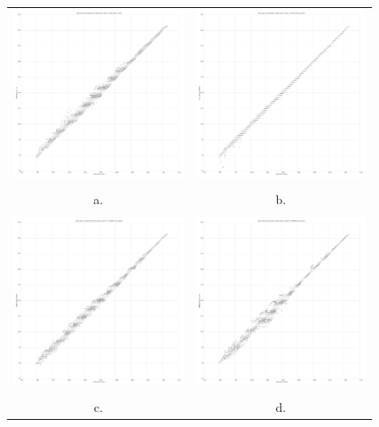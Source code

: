 \documentclass{standalone}
\begin{document}
\tiny
\centering 

\begin{tabular}{m{} m{}}
\multicolumn{1}{c}{\includegraphics[height=50mm]{../../images/graphs/scatterplot_2012_2016.png}}
& \multicolumn{1}{c}{\includegraphics[height=50mm]{../../images/graphs/scatterplot_2012_rusle.png}}\\
\\
\multicolumn{1}{c}{a.} 
& \multicolumn{1}{c}{b.}\\
\\
\multicolumn{1}{c}{\includegraphics[height=50mm]{../../images/graphs/scatterplot_2012_usped.png}}
& \multicolumn{1}{c}{\includegraphics[height=50mm]{../../images/graphs/scatterplot_2012_simwe.png}}\\
\\
\multicolumn{1}{c}{c.} 
& \multicolumn{1}{c}{d.}\\
\end{tabular}
\end{document}
